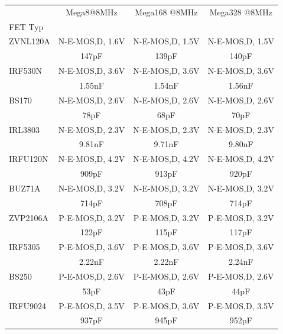 \begin{table}[H]
  \begin{center}
    \begin{tabular}{| l | c | c | c |}
    \hline
             & Mega8@8MHz       & Mega168 @8MHz    & Mega328 @8MHz \\
 FET Typ     &                  &                  &               \\
    \hline
    \hline
ZVNL120A     & N-E-MOS,D, 1.6V  & N-E-MOS,D, 1.5V  & N-E-MOS,D, 1.5V \\
             & 147pF            & 139pF            & 140pF \\
    \hline
IRF530N      & N-E-MOS,D, 3.6V  & N-E-MOS,D, 3.6V  & N-E-MOS,D, 3.6V \\
             & 1.55nF           & 1.54nF           & 1.56nF \\
    \hline
BS170        & N-E-MOS,D, 2.6V  & N-E-MOS,D, 2.6V  & N-E-MOS,D, 2.6V \\
             &  78pF            &  68pF            &  70pF \\
    \hline
IRL3803      & N-E-MOS,D, 2.3V  & N-E-MOS,D, 2.3V  & N-E-MOS,D, 2.3V \\
             & 9.81nF           & 9.71nF           & 9.80nF \\
    \hline
IRFU120N     & N-E-MOS,D, 4.2V  & N-E-MOS,D, 4.2V  & N-E-MOS,D, 4.2V \\
             & 909pF            & 913pF            & 920pF \\
    \hline
BUZ71A       & N-E-MOS,D, 3.2V  & N-E-MOS,D, 3.2V  & N-E-MOS,D, 3.2V \\
             & 714pF            & 708pF            & 714pF \\
    \hline
ZVP2106A     & P-E-MOS,D, 3.2V  & P-E-MOS,D, 3.2V  & P-E-MOS,D, 3.2V \\
             & 122pF            & 115pF            & 117pF \\
    \hline
IRF5305      & P-E-MOS,D, 3.6V  & P-E-MOS,D, 3.6V  & P-E-MOS,D, 3.6V \\
             & 2.22nF           & 2.22nF           & 2.24nF \\
    \hline
BS250        & P-E-MOS,D, 2.6V  & P-E-MOS,D, 2.6V  & P-E-MOS,D, 2.6V \\
             & 53pF             & 43pF             & 44pF \\
    \hline
IRFU9024     & P-E-MOS,D, 3.5V  & P-E-MOS,D, 3.6V  & P-E-MOS,D, 3.5V \\
             & 937pF            & 945pF            & 952pF \\

\end{tabular}
\end{center}
\end{table}
